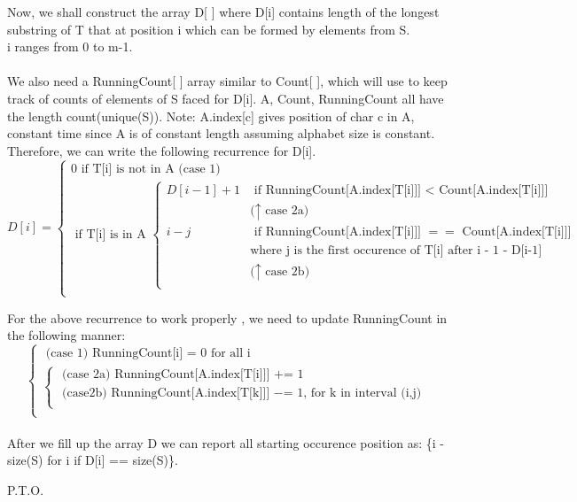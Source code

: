 \documentclass[a4paper,11pt]{article}
\begin{document}
Now, we shall construct the array D[ ] where D[i] contains length of the longest substring of T that  at position i which can be formed by elements from S.
\\
i ranges from 0 to m-1. 
\\
\\
We also need a RunningCount[ ] array similar to Count[ ], which will use to keep track of counts of elements of S faced for D[i].
A, Count, RunningCount all have the length count(unique(S)).
Note: A.index[c] gives position of char c in A, constant time since A is of constant length assuming alphabet size is constant. 
Therefore, we can write the following recurrence for D[i].
\[D[i] = \begin{cases}
          0 \text{ if T[i] is not in A (case 1)} \\
          \text{ if T[i] is in A }\begin{cases}
          D[i-1] + 1 &\text{ if RunningCount[A.index[T[i]]] $<$ Count[A.index[T[i]]]} \\&\text{($\uparrow$ case 2a)} \\
          i - j &\text{ if RunningCount[A.index[T[i]]] $==$ Count[A.index[T[i]]] }\\
          &\text{where j is the first occurence of T[i] after i - 1 - D[i-1] }\\&\text{($\uparrow$ case 2b)} \\
          \end{cases} \\ 
         \end{cases}
    \]

For the above recurrence to work properly , we need to update RunningCount in the following manner:
\[\begin{cases}
            \text{ (case 1) RunningCount[i] = 0 for all i  } \\
          \begin{cases}
           \text{ (case 2a) RunningCount[A.index[T[i]]] += 1} \\
          \text{ (case2b)  RunningCount[A.index[T[k]]] $-$= 1, for k in interval (i,j) }\\
          
          \end{cases} \\ 
         \end{cases}
         \] \\
         
After we fill up the array D we can report all starting occurence position as: \{i - size(S) for  i if D[i] == size(S)\}.
\begin{center}
 P.T.O.
\end{center}
\end{document}
